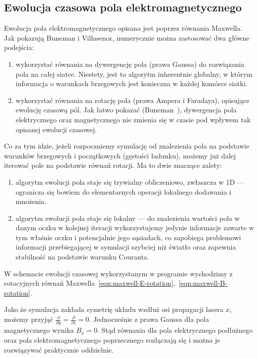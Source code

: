 \subsection{Ewolucja czasowa pola elektromagnetycznego}

Ewolucja pola elektromagnetycznego opisana jest poprzez równania Maxwella.
Jak pokazują Buneman i Villasenor, numerycznie można zastosować dwa główne
podejścia:~\cite{bunemanvillasenor}

\begin{enumerate}
    \item wykorzystać równania na dywergencję pola (prawa Gaussa) do
    rozwiązania pola na całej siatce. Niestety, jest to algorytm
    inherentnie globalny, w którym informacja o warunkach brzegowych
    jest konieczna w każdej komórce siatki.

    \item wykorzystać równania na rotację pola (prawa Ampera i Faradaya),
    opisujące ewolucję czasową pól. Jak łatwo pokazać (Buneman~\cite{bunemanvillasenor}), dywergencja
    pola elektrycznego oraz magnetycznego nie zmienia się w czasie pod
    wpływem tak opisanej ewolucji czasowej.
\end{enumerate}

Co za tym idzie, jeżeli rozpoczniemy symulację od znalezienia pola na
podstawie warunków brzegowych i początkowych (gęstości ładunku), możemy już
dalej iterować pole na podstawie równań rotacji. Ma to dwie znaczące
zalety:

\begin{enumerate}
\item algorytm ewolucji pola staje się trywialny obliczeniowo,
zwłaszcza w 1D --- ogranicza się bowiem do elementarnych operacji lokalnego
dodawania i mnożenia.

\item algorytm ewolucji pola staje się lokalny --- do
znalezienia wartości pola w danym oczku w kolejnej iteracji wykorzystujemy
jedynie informacje zawarte w tym właśnie oczku i potencjalnie jego
sąsiadach, co zapobiega
problemowi informacji przebiegającej w symulacji szybciej niż światło oraz
zapewnia stabilność na podstawie warunku Couranta.
\end{enumerate}

W schemacie ewolucji czasowej wykorzystanym w programie wychodzimy z rotacyjnych równań Maxwella~\ref{eqn:maxwell-E-rotation},~\ref{eqn:maxwell-B-rotation}.

Jako że symulacja zakłada symetrię układu wzdłuż osi propagacji lasera $x$,
możemy przyjąć $\frac{\partial}{\partial y} = \frac{\partial}{\partial z} =
0 $.  Jednocześnie z prawa Gaussa dla pola magnetycznego wynika $B_x = 0$.
Stąd równania dla pola elektrycznego podłużnego oraz pola
elektromagnetycznego poprzecznego rozłączają się i można je rozwiązywać praktycznie oddzielnie.

